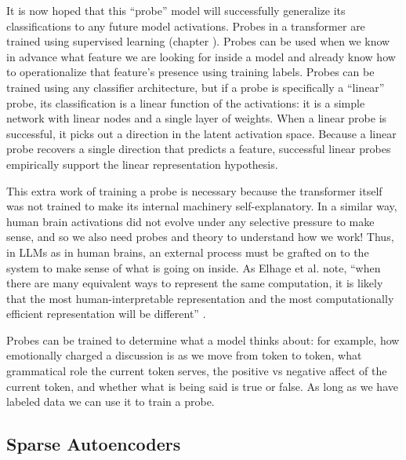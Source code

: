 It is now hoped that this ``probe'' model will successfully generalize its
classifications to any future model activations.  Probes in a transformer are
trained using supervised learning (chapter ). Probes can
be used when we know in advance what feature we are looking for inside a model
and already know how to operationalize that feature's presence using training
labels. Probes can be trained using any classifier architecture, but if a probe
is specifically a ``linear'' probe, its classification is a linear function of
the activations: it is a simple network with linear nodes and a single layer of
weights. When a linear probe is successful, it picks out a direction in the
latent activation space. Because a linear probe recovers a single direction
that predicts a feature, successful linear probes empirically support the
linear representation hypothesis.

This extra work of training a probe is necessary because the transformer itself
was not trained to make its internal machinery self-explanatory. In a similar
way, human brain activations did not evolve under any selective pressure to
make sense, and so we also need probes and theory to understand how we work!
Thus, in LLMs as in human brains, an external process must be grafted on to the
system to make sense of what is going on inside. As Elhage et al. note, ``when
there are many equivalent ways to represent the same computation, it is likely
that the most human-interpretable representation and the most computationally
efficient representation will be different'' \cite{elhage2021mathematical}.

Probes can be trained to determine what a model thinks about: for example, how
emotionally charged a discussion is as we move from token to token, what
grammatical role the current token serves, the positive vs negative affect of
the current token, and whether what is being said is true or false. As long as
we have labeled data we can use it to train a probe.

\subsection{Sparse Autoencoders}

